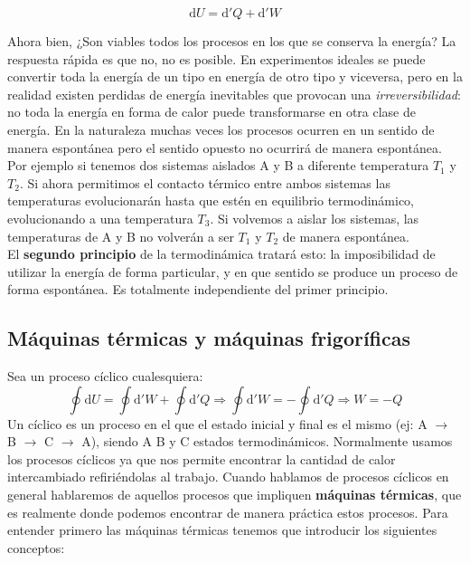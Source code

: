 \documentclass[12pt,a4paper]{article}
\newcommand{\D}{\mathrm{d}}
\begin{document}
$$ \D U = \D ' Q + \D ' W $$

Ahora bien, ¿Son viables todos los procesos en los que se conserva la energía? La respuesta rápida es que no, no es posible. En experimentos ideales se puede convertir toda la energía de un tipo en energía de otro tipo y viceversa, pero en la realidad existen perdidas de energía inevitables que provocan una \textit{irreversibilidad}: no toda la energía en forma de calor puede transformarse en otra clase de energía. En la naturaleza muchas veces los procesos ocurren en un sentido de manera espontánea pero el sentido opuesto no ocurrirá de manera espontánea. Por ejemplo si tenemos dos sistemas aislados A y B a diferente temperatura $T_1$ y $T_2$. Si ahora permitimos el contacto térmico entre ambos sistemas las temperaturas evolucionarán hasta que estén en equilibrio termodinámico, evolucionando a una temperatura $T_3$. Si volvemos a aislar los sistemas, las temperaturas de A y B no volverán a ser $T_1$ y $T_2$ de manera espontánea. \\

El \textbf{segundo principio} de la termodinámica tratará esto: la imposibilidad de utilizar la energía de forma particular, y en que sentido se produce un proceso de forma espontánea. Es totalmente independiente del primer principio. 


\subsection{Máquinas térmicas y máquinas frigoríficas}
Sea un proceso cíclico cualesquiera: 
\begin{equation}
\oint \D U  = \oint \D ' W + \oint \D ' Q \Longrightarrow  \oint \D ' W = - \oint \D ' Q  \Longrightarrow W = -Q
\end{equation}
Un cíclico es un proceso en el que el estado inicial y final es el mismo (ej: A $\rightarrow$ B $\rightarrow$ C $\rightarrow$ A), siendo A B y C estados termodinámicos. Normalmente usamos los procesos cíclicos ya que nos  permite encontrar la cantidad de calor intercambiado refiriéndolas al trabajo. Cuando hablamos de procesos cíclicos en general hablaremos de aquellos procesos que impliquen \textbf{máquinas térmicas}, que es realmente donde podemos encontrar de manera práctica estos procesos. Para entender primero las máquinas térmicas tenemos que introducir los siguientes conceptos:
\end{document}
